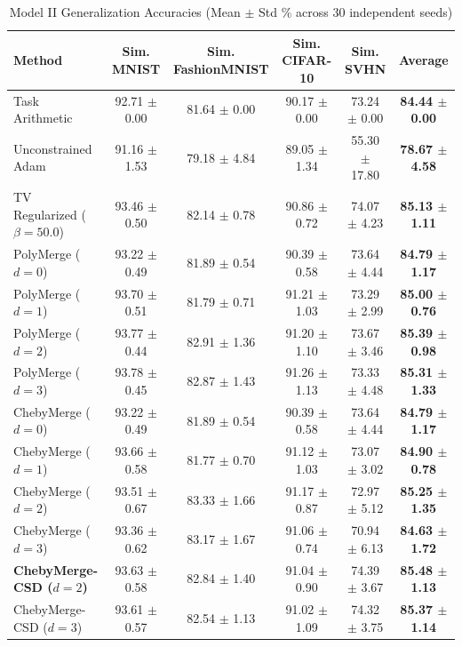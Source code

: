 \begin{table}[t]
\caption{Model II Generalization Accuracies (Mean $\pm$ Std \% across 30 independent seeds)}
\label{tab:model2_results}
\vskip 0.15in
\begin{center}
\begin{small}
\setlength{\tabcolsep}{4.5pt}
\begin{tabular}{lccccc}
\toprule
Method & Sim. MNIST & Sim. FashionMNIST & Sim. CIFAR-10 & Sim. SVHN & \textbf{Average} \\
\midrule
Task Arithmetic & 92.71 $\pm$ 0.00 & 81.64 $\pm$ 0.00 & 90.17 $\pm$ 0.00 & 73.24 $\pm$ 0.00 & \textbf{84.44 $\pm$ 0.00} \\
Unconstrained Adam & 91.16 $\pm$ 1.53 & 79.18 $\pm$ 4.84 & 89.05 $\pm$ 1.34 & 55.30 $\pm$ 17.80 & \textbf{78.67 $\pm$ 4.58} \\
TV Regularized ($\beta=50.0$) & 93.46 $\pm$ 0.50 & 82.14 $\pm$ 0.78 & 90.86 $\pm$ 0.72 & 74.07 $\pm$ 4.23 & \textbf{85.13 $\pm$ 1.11} \\
\midrule
PolyMerge ($d=0$) & 93.22 $\pm$ 0.49 & 81.89 $\pm$ 0.54 & 90.39 $\pm$ 0.58 & 73.64 $\pm$ 4.44 & \textbf{84.79 $\pm$ 1.17} \\
PolyMerge ($d=1$) & 93.70 $\pm$ 0.51 & 81.79 $\pm$ 0.71 & 91.21 $\pm$ 1.03 & 73.29 $\pm$ 2.99 & \textbf{85.00 $\pm$ 0.76} \\
PolyMerge ($d=2$) & 93.77 $\pm$ 0.44 & 82.91 $\pm$ 1.36 & 91.20 $\pm$ 1.10 & 73.67 $\pm$ 3.46 & \textbf{85.39 $\pm$ 0.98} \\
PolyMerge ($d=3$) & 93.78 $\pm$ 0.45 & 82.87 $\pm$ 1.43 & 91.26 $\pm$ 1.13 & 73.33 $\pm$ 4.48 & \textbf{85.31 $\pm$ 1.33} \\
\midrule
ChebyMerge ($d=0$) & 93.22 $\pm$ 0.49 & 81.89 $\pm$ 0.54 & 90.39 $\pm$ 0.58 & 73.64 $\pm$ 4.44 & \textbf{84.79 $\pm$ 1.17} \\
ChebyMerge ($d=1$) & 93.66 $\pm$ 0.58 & 81.77 $\pm$ 0.70 & 91.12 $\pm$ 1.03 & 73.07 $\pm$ 3.02 & \textbf{84.90 $\pm$ 0.78} \\
ChebyMerge ($d=2$) & 93.51 $\pm$ 0.67 & 83.33 $\pm$ 1.66 & 91.17 $\pm$ 0.87 & 72.97 $\pm$ 5.12 & \textbf{85.25 $\pm$ 1.35} \\
ChebyMerge ($d=3$) & 93.36 $\pm$ 0.62 & 83.17 $\pm$ 1.67 & 91.06 $\pm$ 0.74 & 70.94 $\pm$ 6.13 & \textbf{84.63 $\pm$ 1.72} \\
\midrule
\textbf{ChebyMerge-CSD ($d=2$)} & 93.63 $\pm$ 0.58 & 82.84 $\pm$ 1.40 & 91.04 $\pm$ 0.90 & 74.39 $\pm$ 3.67 & \textbf{85.48 $\pm$ 1.13} \\
ChebyMerge-CSD ($d=3$) & 93.61 $\pm$ 0.57 & 82.54 $\pm$ 1.13 & 91.02 $\pm$ 1.09 & 74.32 $\pm$ 3.75 & \textbf{85.37 $\pm$ 1.14} \\
\bottomrule
\end{tabular}
\end{small}
\end{center}
\vskip -0.1in
\end{table}

